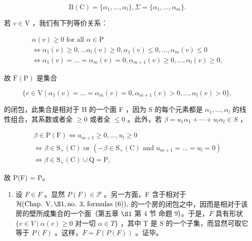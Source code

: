 \[
\mathrm{B} (\mathrm{C}) = \{\alpha_ {1}, \dots , \alpha_ {l} \}, \Sigma = \{\alpha_ {1}, \dots , \alpha_ {m} \}.
\]

若 \(v \in \mathrm{V}\) ，我们有下列等价关系：

\[
\begin{array}{c} \alpha (v) \geq 0 \text {   for   all   } \alpha \in \mathrm{P} \\ \Longleftrightarrow \alpha_ {1} (v) \geq 0, \ldots \alpha_ {l} (v) \geq 0, \alpha_ {1} (v) \leq 0, \ldots , \alpha_ {m} (v) \leq 0 \\ \Longleftrightarrow \alpha_ {1} (v) = \dots = \alpha_ {m} (v) = 0, \alpha_ {m + 1} (v) \geq 0, \ldots , \alpha_ {l} (v) \geq 0, \end{array}
\]

故 \(\overline{\mathrm{F}}(\mathrm{P})\) 是集合

\[
\{v \in \mathrm{V} \mid \alpha_ {1} (v) = \dots = \alpha_ {m} (v) = 0, \alpha_ {m + 1} (v) > 0, \dots , \alpha_ {l} (v) > 0 \},
\]

的闭包，此集合是相对于 H 的一个面 F ，因为 S 的每个元素都是 \(\alpha_{1},\ldots,\alpha_{l}\) 的线性组合，其系数或者全 \(\geq0\) 或者全 \(\leq0\) 。此外，若 \(\beta=u_{1}\alpha_{1}+\cdots+u_{l}\alpha_{l}\in S\) ，

\[
\begin{array}{c} \beta \in \mathrm{P} (\mathrm{F}) \Longleftrightarrow u _ {m + 1} \geq 0, \ldots , u _ {l} \geq 0 \\ \Longleftrightarrow \beta \in \mathrm{S} _ {+} (\mathrm{C}) \text {   or   } (- \beta \in \mathrm{S} _ {+} (\mathrm{C}) \text {   and   } u _ {m + 1} = \ldots = u _ {l} = 0) \\ \Longleftrightarrow \beta \in \mathrm{S} _ {+} (\mathrm{C}) \cup \mathrm{Q} = \mathrm{P}, \end{array}
\]

故 P(F) = P。

\begin{enumerate}
\def\labelenumi{\alph{enumi})}
\setcounter{enumi}{1}
\tightlist
\item
  设 \(F \in F\) 。显然 \(P(F) \in \mathcal{P}\) 。另一方面，F 含于相对于 \(\mathcal{H}(\text{Chap. V}, \S1, \text{no. 3, formulas (6)}),\) 的一个房的闭包之中，因而是相对于该房的壁所成集合的一个面（第五章 \(\S1\) 第 4 节 命题 9）。于是，\(\overline{F}\) 具有形状 \(\{v \in V \mid \alpha(v) \geq 0 \text{ 对一切 } \alpha \in T\}\) ，其中 T 是 S 的一个子集，而显然可取它等于 \(P(F)\) 。这样，\(\overline{F} = \overline{F}(P(F))\) 。证毕。
\end{enumerate}

